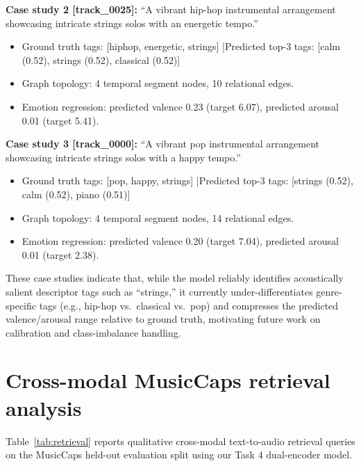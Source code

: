 \documentclass[10pt]{article}
\begin{document}
\textbf{Case study 2 [track\_0025]:} ``A vibrant hip-hop instrumental arrangement showcasing intricate strings solos with an energetic tempo.''
\begin{itemize}[nosep]
  \item Ground truth tags: [hiphop, energetic, strings] \quad|\quad Predicted top-3 tags: [calm (0.52), strings (0.52), classical (0.52)]
  \item Graph topology: 4 temporal segment nodes, 10 relational edges.
  \item Emotion regression: predicted valence 0.23 (target 6.07), predicted arousal 0.01 (target 5.41).
\end{itemize}

\textbf{Case study 3 [track\_0000]:} ``A vibrant pop instrumental arrangement showcasing intricate strings solos with a happy tempo.''
\begin{itemize}[nosep]
  \item Ground truth tags: [pop, happy, strings] \quad|\quad Predicted top-3 tags: [strings (0.52), calm (0.52), piano (0.51)]
  \item Graph topology: 4 temporal segment nodes, 14 relational edges.
  \item Emotion regression: predicted valence 0.20 (target 7.04), predicted arousal 0.01 (target 2.38).
\end{itemize}

These case studies indicate that, while the model reliably identifies acoustically salient descriptor tags such as ``strings,'' it currently under-differentiates genre-specific tags (e.g., hip-hop vs.\ classical vs.\ pop) and compresses the predicted valence/arousal range relative to ground truth, motivating future work on calibration and class-imbalance handling.

\section{Cross-modal MusicCaps retrieval analysis}

Table~\ref{tab:retrieval} reports qualitative cross-modal text-to-audio retrieval queries on the MusicCaps held-out evaluation split using our Task 4 dual-encoder model.
\end{document}
